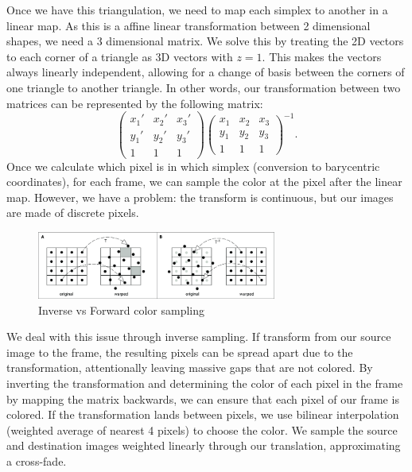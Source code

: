 \documentclass[a4paper]{article}
\begin{document}
Once we have this triangulation, we need to map each simplex to another in a linear map. As this is a affine linear transformation between 2 dimensional shapes, we need a 3 dimensional matrix. We solve this by treating the 2D vectors to each corner of a triangle as 3D vectors with $z = 1$. This makes the vectors always linearly independent, allowing for a change of basis between the corners of one triangle to another triangle. In other words, our transformation between two matrices can be represented by the following matrix:
\[
    \begin{pmatrix}
        x_1' & x_2' & x_3' \\
        y_1' & y_2' & y_3' \\
        1 & 1 & 1
    \end{pmatrix}
    \begin{pmatrix}
        x_1 & x_2 & x_3 \\
        y_1 & y_2 & y_3 \\
        1 & 1 & 1
    \end{pmatrix}^{-1}.
\] 
Once we calculate which pixel is in which simplex (conversion to barycentric coordinates), for each frame, we can sample the color at the pixel after the linear map. However, we have a problem: the transform is continuous, but our images are made of discrete pixels.
\begin{figure}[H]
    \centering
    \includegraphics[width=0.7\textwidth]{../slides/public/imgs/sampling.png}
    \caption{Inverse vs Forward color sampling}
\end{figure}
We deal with this issue through inverse sampling. If transform from our source image to the frame, the resulting pixels can be spread apart due to the transformation, attentionally leaving massive gaps that are not colored. By inverting the transformation and determining the color of each pixel in the frame by mapping the matrix backwards, we can ensure that each pixel of our frame is colored. If the transformation lands between pixels, we use bilinear interpolation (weighted average of nearest 4 pixels) to choose the color. We sample the source and destination images weighted linearly through our translation, approximating a cross-fade.
\end{document}

